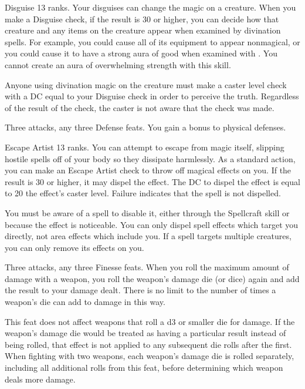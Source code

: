 \featpre Disguise 13 ranks.
\featben Your disguises can change the magic on a creature.
When you make a Disguise check, if the result is 30 or higher, you can decide how that creature and any items on the creature appear when examined by divination spells.
For example, you could cause all of its equipment to appear nonmagical, or you could cause it to have a strong aura of good when examined with .
You cannot create an aura of overwhelming strength with this skill.

Anyone using divination magic on the creature must make a caster level check with a DC equal to your Disguise check in order to perceive the truth.
Regardless of the result of the check, the caster is not aware that the check was made.

\featpres Three attacks, any three Defense feats.
\featben You gain a  bonus to physical defenses.

\featpre Escape Artist 13 ranks.
\featben You can attempt to escape from magic itself, slipping hostile spells off of your body so they dissipate harmlessly.
As a standard action, you can make an Escape Artist check to throw off magical effects on you.
If the result is 30 or higher, it may dispel the effect.
The DC to dispel the effect is equal to 20 \add the effect's caster level.
Failure indicates that the spell is not dispelled.

You must be aware of a spell to disable it, either through the Spellcraft skill or because the effect is noticeable.
You can only dispel spell effects which target you directly, not area effects which include you.
If a spell targets multiple creatures, you can only remove its effects on you.

\featpres Three attacks, any three Finesse feats.
\featben When you roll the maximum amount of damage with a weapon, you roll the weapon's damage die (or dice) again and add the result to your damage dealt.
There is no limit to the number of times a weapon's die can add to damage in this way.

This feat does not affect weapons that roll a d3 or smaller die for damage.
If the weapon's damage die would be treated as having a particular result instead of being rolled, that effect is not applied to any subsequent die rolls after the first.
When fighting with two weapons, each weapon's damage die is rolled separately, including all additional rolls from this feat, before determining which weapon deals more damage.

